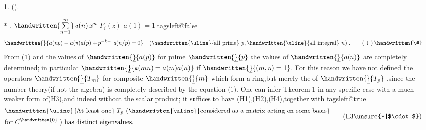  1. ().

*  .  $\handwritten{\sum\limits_{n=1}^{\infty}}\,a(n)\,x^{n}$  $F_i(z)$  $a(1)=1$ 
\csname tagsleft@false\endcsname
\[
\handwritten{\underline}{a(np)-a(n)a(p)+p^{-k-1}a(n/p)=0}\quad
(\text{\handwritten{\uline}{all prime} }p,\text{\handwritten{\uline}{all integral} }n)\ .
\tag*{( 1 )\,\handwritten{\#}}
\]
From (1) and the values of $\handwritten{\underline}{a(p)}$ for prime $\handwritten{\underline}{p}$ the values of $\handwritten{\underline}{a(n)}$ are completely determined; in particular $\handwritten{\underline}{a(mn)=a(m)a(n)}$ if $\handwritten{\underline}{(m,n)=1}$. For this reason we have not defined the operators $\handwritten{\underline}{T_m}$ for composite $\handwritten{\underline}{m}$ which form a ring,but merely the  of $\handwritten{\underline}{T_p}$ ,since the number theory(if not the algebra) is completely described by the equation (1). One can infer Theorem 1 in any specific case with a much weaker form of(H3),and indeed without the scalar product; it suffices to have (H1),(H2),(H4),together with
\csname tagsleft@true\endcsname
\[
\begin{aligned}
&\text{\handwritten{\uline}{At least one} } T_p\ \text{(\handwritten{\uline}{considered as a matrix acting on some basis}}\\
&\text{for } C^{\handwritten{0}}\text{ ) has distinct eigenvalues.}
\end{aligned}
\tag*{(H3\unsure{*|$\cdot$})}
\]
\endgroup

